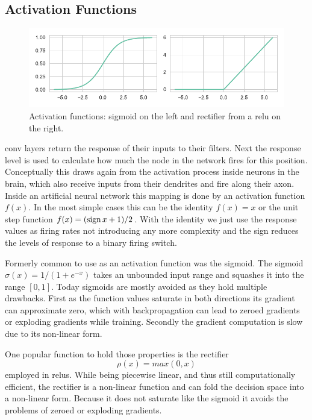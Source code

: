 \subsection{Activation Functions} %
\label{sub:conepts:nn:activations}
\begin{figure}
    \includegraphics{figures/sigmoid_relu}
    \caption{Activation functions: sigmoid on the left and rectifier from a \gls{relu} on the right.}
    \label{fig:sigmoid_relu}
\end{figure}
\gls{conv} layers return the response of their inputs to their filters. Next the response level is used to calculate how much the node in the network fires for this position. Conceptually this draws again from the activation process inside neurons in the brain, which also receive inputs from their dendrites and fire along their axon. Inside an artificial neural network this mapping is done by an activation function $f(x)$. In the most simple cases this can be the identity $f(x) = x$ or the unit step function $f(x) = (\operatorname{sign} x + 1) / 2$. With the identity we just use the response values as firing rates not introducing any more complexity and the sign reduces the levels of response to a binary firing switch.

Formerly common to use as an activation function was the sigmoid. The sigmoid $\sigma(x) = 1/(1+e^{-x})$  takes an unbounded input range and squashes it into the range $[0, 1]$. Today sigmoids are mostly avoided as they hold multiple drawbacks. First as the function values saturate in both directions its gradient can approximate zero, which with backpropagation can lead to zeroed gradients or exploding gradients while training. Secondly the gradient computation is slow due to its non-linear form.

One popular function to hold those properties is the rectifier 
\begin{equation}
    \rho(x) = max(0, x)
\end{equation}
employed in \glspl{relu}. While being piecewise linear, and thus still computationally efficient, the rectifier is a non-linear function and can fold the decision space into a non-linear form. Because it does not saturate like the sigmoid it avoids the problems of zeroed or exploding gradients.

